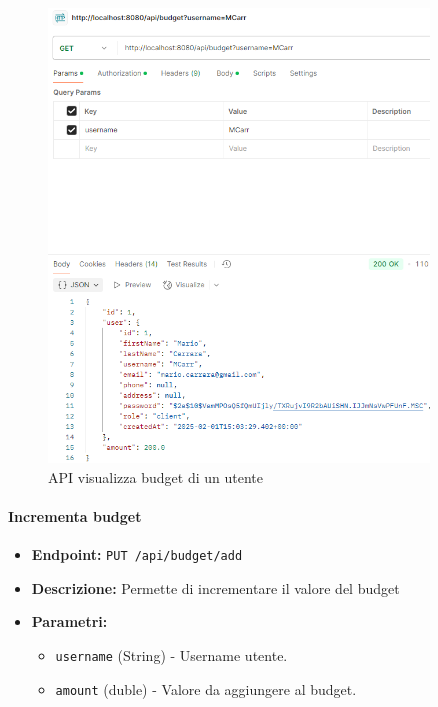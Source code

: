 \begin{figure}[H]
    \centering
    \includegraphics[width=0.9\textwidth]{images/GetBudgetAPI.png}
    \caption{API visualizza budget di un utente}
    \label{fig:GetBudgetAPI}
\end{figure}

\paragraph{Incrementa budget} 

\begin{itemize}
    \item \textbf{Endpoint:} \texttt{PUT /api/budget/add}
    \item \textbf{Descrizione:} Permette di incrementare il valore  del budget
    \item \textbf{Parametri:}
    \begin{itemize}
        \item \texttt{username} (String) - Username utente.
        \item \texttt{amount} (duble) - Valore da aggiungere al budget.
    \end{itemize}
\end{itemize}

